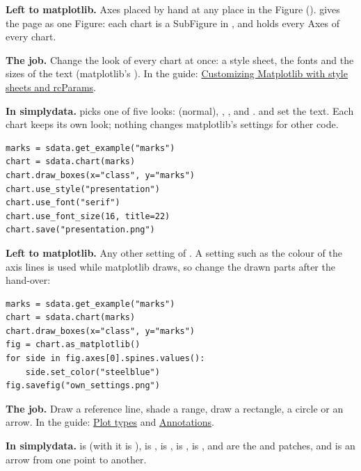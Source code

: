 \textbf{Left to matplotlib.} Axes placed by hand at any place in the Figure ().
 gives the page as one Figure: each chart is a SubFigure in
, and  holds every Axes of every chart.


\textbf{The job.} Change the look of every chart at once: a style sheet, the fonts and the sizes of the
text (matplotlib's ). In the guide:
\href{https://matplotlib.org/stable/users/explain/customizing.html}{Customizing Matplotlib with style
sheets and rcParams}.

\textbf{In simplydata.}  picks one of five looks:  (normal),
, ,  and .
 and  set the text. Each chart keeps its own look; nothing
changes matplotlib's settings for other code.

\begin{lstlisting}[style=py]
marks = sdata.get_example("marks")
chart = sdata.chart(marks)
chart.draw_boxes(x="class", y="marks")
chart.use_style("presentation")
chart.use_font("serif")
chart.use_font_size(16, title=22)
chart.save("presentation.png")
\end{lstlisting}

\textbf{Left to matplotlib.} Any other setting of . A setting such as the colour of the
axis lines is used while matplotlib draws, so change the drawn parts after the hand-over:

\begin{lstlisting}[style=py]
marks = sdata.get_example("marks")
chart = sdata.chart(marks)
chart.draw_boxes(x="class", y="marks")
fig = chart.as_matplotlib()
for side in fig.axes[0].spines.values():
    side.set_color("steelblue")
fig.savefig("own_settings.png")
\end{lstlisting}


\textbf{The job.} Draw a reference line, shade a range, draw a rectangle, a circle or an arrow. In the
guide: \href{https://matplotlib.org/stable/plot_types/index.html}{Plot types} and
\href{https://matplotlib.org/stable/users/explain/text/annotations.html}{Annotations}.

\textbf{In simplydata.}  is  (with  it is
),  is ,  is
,  is ,  is
,  and  are the  and
 patches, and  is an arrow from one point to another.

